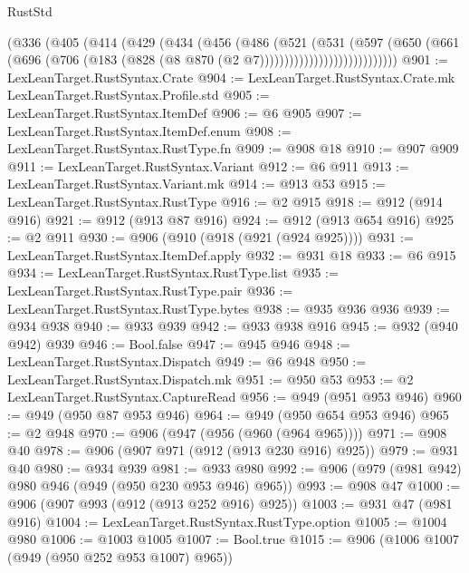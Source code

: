 \begin{lexlean}{RustStd}
\begin{coremodule}
{\begin{coremodule}
{{{{{{{{{{{{{{{{{{{{{{{{{{{{{{{                        (@336
                          (@405
                            (@414
                              (@429
                                (@434
                                  (@456
                                    (@486
                                      (@521
                                        (@531
                                          (@597
                                            (@650
                                              (@661
                                                (@696
                                                  (@706
                                                    (@183
                                                      (@828
                                                        (@8 @870 (@2 @7))))))))))))))))))))))))))))
@901 := LexLeanTarget.RustSyntax.Crate
@904 := LexLeanTarget.RustSyntax.Crate.mk LexLeanTarget.RustSyntax.Profile.std
@905 := LexLeanTarget.RustSyntax.ItemDef
@906 := @6 @905
@907 := LexLeanTarget.RustSyntax.ItemDef.enum
@908 := LexLeanTarget.RustSyntax.RustType.fn
@909 := @908 @18
@910 := @907 @909
@911 := LexLeanTarget.RustSyntax.Variant
@912 := @6 @911
@913 := LexLeanTarget.RustSyntax.Variant.mk
@914 := @913 @53
@915 := LexLeanTarget.RustSyntax.RustType
@916 := @2 @915
@918 := @912 (@914 @916)
@921 := @912 (@913 @87 @916)
@924 := @912 (@913 @654 @916)
@925 := @2 @911
@930 := @906 (@910 (@918 (@921 (@924 @925))))
@931 := LexLeanTarget.RustSyntax.ItemDef.apply
@932 := @931 @18
@933 := @6 @915
@934 := LexLeanTarget.RustSyntax.RustType.list
@935 := LexLeanTarget.RustSyntax.RustType.pair
@936 := LexLeanTarget.RustSyntax.RustType.bytes
@938 := @935 @936 @936
@939 := @934 @938
@940 := @933 @939
@942 := @933 @938 @916
@945 := @932 (@940 @942) @939
@946 := Bool.false
@947 := @945 @946
@948 := LexLeanTarget.RustSyntax.Dispatch
@949 := @6 @948
@950 := LexLeanTarget.RustSyntax.Dispatch.mk
@951 := @950 @53
@953 := @2 LexLeanTarget.RustSyntax.CaptureRead
@956 := @949 (@951 @953 @946)
@960 := @949 (@950 @87 @953 @946)
@964 := @949 (@950 @654 @953 @946)
@965 := @2 @948
@970 := @906 (@947 (@956 (@960 (@964 @965))))
@971 := @908 @40
@978 := @906 (@907 @971 (@912 (@913 @230 @916) @925))
@979 := @931 @40
@980 := @934 @939
@981 := @933 @980
@992 := @906 (@979 (@981 @942) @980 @946 (@949 (@950 @230 @953 @946) @965))
@993 := @908 @47
@1000 := @906 (@907 @993 (@912 (@913 @252 @916) @925))
@1003 := @931 @47 (@981 @916)
@1004 := LexLeanTarget.RustSyntax.RustType.option
@1005 := @1004 @980
@1006 := @1003 @1005
@1007 := Bool.true
@1015 := @906 (@1006 @1007 (@949 (@950 @252 @953 @1007) @965))
}}}}}}}}}}}}}}}}}}}}}}}}}}}}}}}
\end{coremodule}}
\end{coremodule}
\end{lexlean}

